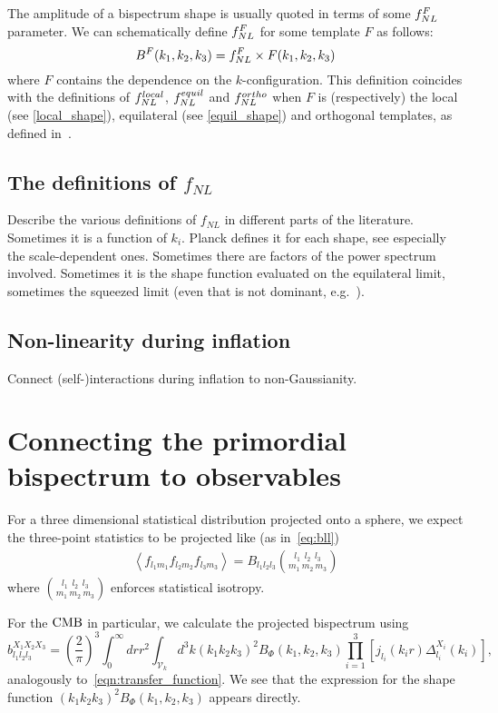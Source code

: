 The amplitude of a bispectrum shape is usually
quoted in terms of some $f_{NL}^F$ parameter.
We can schematically define $f_{NL}^F$ for some template $F$ as follows:
\begin{equation}\label{def:fnl}
{
B^{F}(k_1,k_2,k_3) = f_{NL}^{F}\times F(k_1,k_2,k_3)
}
\end{equation}
where $F$ contains the dependence on the $k$-configuration.
This definition coincides with the definitions of
$f^{local}_{NL}$, $f^{equil}_{NL}$ and $f^{ortho}_{NL}$
when $F$ is (respectively) the local (see \eqref{local_shape}),
equilateral (see \eqref{equil_shape}) and orthogonal templates,
as defined in~\cite{Planck_NG_2015}.

    \subsection{The definitions of $f_{NL}$}
    Describe the various definitions of $f_{NL}$ in different
    parts of the literature.
    Sometimes it is a function of $k_i$. Planck defines it for each
    shape, see especially the scale-dependent ones. Sometimes there are
    factors of the power spectrum involved. Sometimes it is the shape
    function evaluated on the equilateral limit, sometimes the squeezed limit
    (even that is not dominant, e.g.~\cite{dbi_in_the_sky}).
    \subsection{Non-linearity during inflation}
    Connect (self-)interactions during inflation to non-Gaussianity.
\section{Connecting the primordial bispectrum to observables}
    For a three dimensional statistical distribution projected onto
    a sphere, we expect the three-point statistics to be projected
    like (as in~\eqref{eq:bll})
    \begin{align}
        \left<f_{l_1m_1}f_{l_2m_2}f_{l_3m_3}\right> = B_{l_1l_2l_3}{{l_1~~l_2~~l_3} \choose {m_1~m_2~m_3}}
    \end{align}
    where ${{l_1~~l_2~~l_3} \choose {m_1~m_2~m_3}}$ enforces statistical isotropy.


    For the $\text{CMB}$ in particular, we calculate the projected bispectrum using
    \begin{equation}
    \label{eq:reduced_cmb}
    b^{X_1X_2X_3}_{l_1l_2l_3} = \left(\frac{2}{\pi}\right)^3\int_{0}^{\infty}drr^2
        \int_{\mathcal{V}_k}d^3k (k_1k_2k_3)^2 B_{\Phi}(k_1,k_2,k_3)\prod_{i=1}^{3}\left[j_{l_i}(k_ir)\Delta^{X_i}_{l_i}(k_i)\right],
    \end{equation}
    analogously to~\eqref{eqn:transfer_function}.
    We see that the expression for the shape function $(k_1k_2k_3)^2 B_{\Phi}(k_1,k_2,k_3)$ appears directly.


